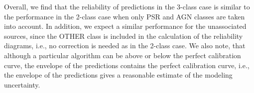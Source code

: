 Overall, we find that the reliability of predictions in the 3-class case is similar to the performance
in the 2-class case when only PSR and AGN classes are taken into account.
In addition, we expect a similar performance for the unassociated sources, since the OTHER class is included in the 
calculation of the reliability diagrams, i.e., no correction is needed as in the 2-class case.
We also note, that although a particular algorithm can be above or below the perfect calibration curve, 
the envelope of the predictions contains the perfect calibration curve, i.e., the envelope of the predictions gives a reasonable
estimate of the modeling uncertainty.






